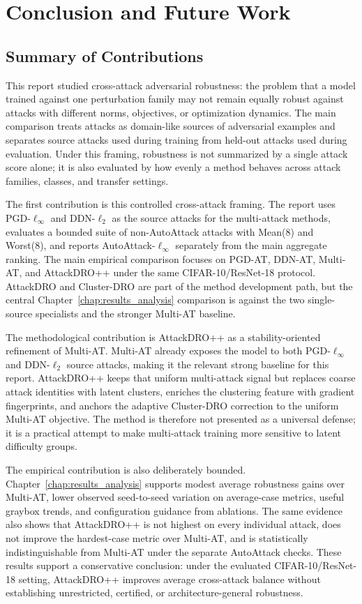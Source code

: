 \chapter{Conclusion and Future Work}
\label{chap:conclusion}

\section{Summary of Contributions}

This report studied cross-attack adversarial robustness: the problem that a
model trained against one perturbation family may not remain equally robust
against attacks with different norms, objectives, or optimization dynamics.  The
main comparison treats attacks as domain-like sources of adversarial examples
and separates source attacks used during training from held-out attacks used
during evaluation.  Under this framing, robustness is not summarized by a single
attack score alone; it is also evaluated by how evenly a method behaves across
attack families, classes, and transfer settings.

The first contribution is this controlled cross-attack framing.  The report
uses PGD-$\ell_\infty$ and DDN-$\ell_2$ as the source attacks for the
multi-attack methods, evaluates a bounded suite of non-AutoAttack attacks with
Mean(8) and Worst(8), and reports AutoAttack-$\ell_\infty$ separately from the
main aggregate ranking.  The main empirical comparison focuses on PGD-AT,
DDN-AT, Multi-AT, and AttackDRO++ under the same CIFAR-10/ResNet-18 protocol.
AttackDRO and Cluster-DRO are part of the method development path, but the
central Chapter~\ref{chap:results_analysis} comparison is against the two
single-source specialists and the stronger Multi-AT baseline.

The methodological contribution is AttackDRO++ as a stability-oriented
refinement of Multi-AT.  Multi-AT already exposes the model to both
PGD-$\ell_\infty$ and DDN-$\ell_2$ source attacks, making it the relevant strong
baseline for this report.  AttackDRO++ keeps that uniform multi-attack signal
but replaces coarse attack identities with latent clusters, enriches the
clustering feature with gradient fingerprints, and anchors the adaptive
Cluster-DRO correction to the uniform Multi-AT objective.  The method is
therefore not presented as a universal defense; it is a practical attempt to
make multi-attack training more sensitive to latent difficulty groups.

The empirical contribution is also deliberately bounded.  Chapter~\ref{chap:results_analysis}
supports modest average robustness gains over Multi-AT, lower observed
seed-to-seed variation on average-case metrics, useful graybox trends, and
configuration guidance from ablations.  The same evidence also shows that
AttackDRO++ is not highest on every individual attack, does not improve the
hardest-case metric over Multi-AT, and is statistically indistinguishable from
Multi-AT under the separate AutoAttack checks.  These results support a
conservative conclusion: under the evaluated CIFAR-10/ResNet-18 setting,
AttackDRO++ improves average cross-attack balance without establishing
unrestricted, certified, or architecture-general robustness.

